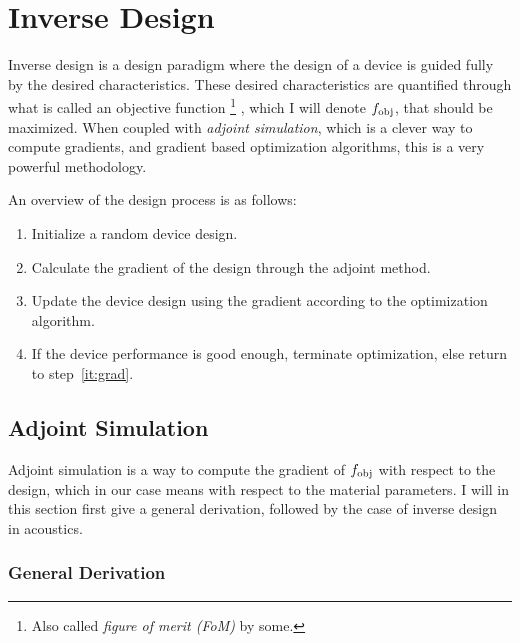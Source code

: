 

\section{Inverse Design}

Inverse design is a design paradigm where the design of a device is guided fully by
the desired characteristics.
These desired characteristics are quantified through what is called an objective
function%
\footnote{
	Also called \emph{figure of merit (FoM)} by some.%
}%
, which I will denote $f_\text{obj}$,
that should be maximized.
When coupled with \emph{adjoint simulation}, which is a clever way to compute
gradients, and gradient based optimization
algorithms, this is a very powerful methodology.

An overview of the design process is as follows:
\begin{enumerate}
	\item Initialize a random device design.
	\item\label{it:grad} Calculate the gradient of the design through the adjoint method.
	\item Update the device design using the gradient according to the optimization algorithm.
	\item If the device performance is good enough, terminate optimization, else
		return to step~\ref{it:grad}.
\end{enumerate}

\subsection{Adjoint Simulation}

Adjoint simulation is a way to compute the gradient of $f_\text{obj}$ with respect to
the design, which in our case means with respect to the material parameters.
I will in this section first give a general derivation, followed by the case of
inverse design in acoustics.

\subsubsection{General Derivation}\label{sec:general_derivation}


